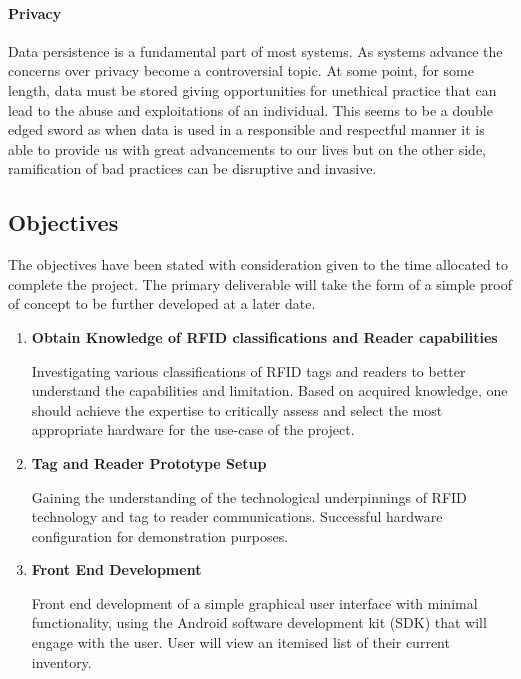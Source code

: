 \documentclass[a4paper, 11pt]{article}
\begin{document}
{\paragraph{Privacy}Data persistence is a fundamental part of most systems. As systems advance the concerns over privacy become a controversial topic. At some point, for some length, data must be stored giving opportunities for unethical practice that can lead to the abuse and exploitations of an individual. This seems to be a double edged sword as when data is used in a responsible and respectful manner it is able to provide us with great advancements to our lives but on the other side, ramification of bad practices can be disruptive and invasive.
\clearpage

\subsection{Objectives}
The objectives have been stated with consideration given to the time allocated to complete the project. The primary deliverable will take the form of a simple proof of concept to be further developed at a later date. 

\begin{enumerate}

   \item \textbf{Obtain Knowledge of RFID classifications and Reader capabilities}
   	\begin{flushleft}Investigating various classifications of RFID tags and readers to better understand the capabilities and limitation. Based on acquired knowledge, one should achieve the expertise to critically assess and select the most appropriate hardware for the use-case of the project.
  	\end{flushleft}
	
   \item \textbf{Tag and Reader Prototype Setup}
   	\begin{flushleft}Gaining the understanding of the technological underpinnings of RFID technology and tag to reader communications. Successful hardware configuration for demonstration purposes.
  	\end{flushleft}
  
   \item \textbf{Front End Development}
   	\begin{flushleft}Front end development of a simple graphical user interface with minimal functionality, using the Android software development kit (SDK) that will engage with the user. User will view an itemised list of their current inventory.
		  \end{flushleft}
  

\end{enumerate}}
\end{document}

